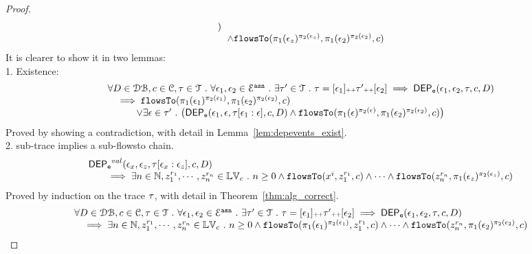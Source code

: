 \begin{proof}
$$\begin{array}{l}
    )
    \\ \quad
    \land 
    \mathtt{flowsTo}(\pi_1(\mathtt{\epsilon}_z)^{\pi_2(\mathtt{\epsilon}_z)}, \pi_1(\mathtt{\epsilon}_2)^{\pi_2(\mathtt{\epsilon}_2)}, c) 
\end{array}
$$
%
It is clearer to show it in two lemmas:
\\
1. Existence:
\[
	\begin{array}{l}
		\forall D \in \dbdom , c \in \cdom, \trace \in \mathcal{T} \st \forall \event_1, \event_2 \in \eventset^{\asn} \st
		 \exists \trace' \in \mathcal{T} \st \trace = [\event_1] \tracecat \trace' \tracecat [\event_2]
		\implies
		\eventdep(\event_1, \event_2, \trace, c, D) 
		\\ \quad 
		\implies 
		\flowsto(\pi_1(\event_1)^{\pi_2(\event_1)}, \pi_1(\event_2)^{\pi_2(\event_2)}, c) 
		\\ \qquad \quad \lor
		\exists \event \in \trace' \st 
		\left( 		
			\eventdep(\event_1, \event, \trace[\event_1:\event], c, D)
		\land 
		\flowsto(\pi_1(\event)^{\pi_2(\event)}, \pi_1(\event_2)^{\pi_2(\event_2)}, c) 
	\right) 
	\end{array}
\]
Proved by showing a contradiction, with detail in Lemma~\ref{lem:depevents_exist}.
%
\\
2. sub-trace implies a sub-flowsto chain.
%
\[
  \begin{array}{l}
    \mathsf{DEP_{\mathtt{e}}}^{val}(\mathtt{\epsilon}_x, \mathtt{\epsilon}_z, \mathtt{\tau}[\mathtt{\epsilon}_x: \mathtt{\epsilon}_z], c, D)
    \\ \qquad 
    \implies 
    \exists n \in \mathbb{N}, z_1^{r_1}, \cdots, z_n^{r_n} \in \mathbb{LV}_{{c}} ~.~ n \geq 0 \land
\mathtt{flowsTo}(x^i,  z_1^{r_1}, c) 
\land \cdots \land \mathtt{flowsTo}(z_n^{r_n},  \pi_1(\mathtt{\epsilon}_z)^{\pi_2(\mathtt{\epsilon}_z)}, c)
\end{array}
\]
%
Proved by induction on the trace $\mathtt{\tau}$, with detail in Theorem~\ref{thm:alg_correct}.
%
\[
  \begin{array}{l}
		\forall D \in \mathcal{DB} , c \in \mathcal{C}, \mathtt{\tau} \in \mathcal{T} ~.~ \forall \mathtt{\epsilon}_1, \mathtt{\epsilon}_2 \in \mathcal{E}^{\mathtt{{asn}}} ~.~
		 \exists \mathtt{\tau}' \in \mathcal{T} ~.~ \mathtt{\tau} = [\mathtt{\epsilon}_1] {\scriptscriptstyle ++} \mathtt{\tau}' {\scriptscriptstyle ++} [\mathtt{\epsilon}_2]
		\implies
		\mathsf{DEP_{\mathtt{e}}}(\mathtt{\epsilon}_1, \mathtt{\epsilon}_2, \mathtt{\tau}, c, D) 
		\\ \quad 
		\implies 
    \exists n \in \mathbb{N}, z_1^{r_1}, \cdots, z_n^{r_n} \in \mathbb{LV}_{{c}} ~.~ n \geq 0 \land
		\mathtt{flowsTo}(\pi_1(\mathtt{\epsilon}_1)^{\pi_2(\mathtt{\epsilon}_1)},  z_1^{r_1}, c) 
    \land \cdots \land \mathtt{flowsTo}(z_n^{r_n}, \pi_1(\mathtt{\epsilon}_2)^{\pi_2(\mathtt{\epsilon}_2)}, c) 

\end{array}\]
\end{proof}
